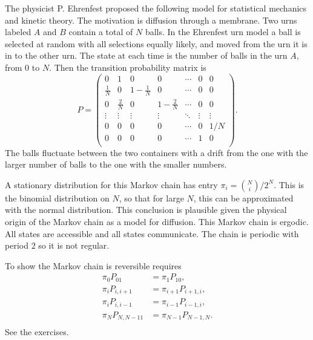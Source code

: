 \documentclass[12pt]{article}
\begin{document}
The physicist P. Ehrenfest proposed the following model for statistical
mechanics and kinetic theory.  The motivation is diffusion through a
membrane.  Two urns labeled \( A \) and \( B \) contain a total of \( N \)
balls.  In the Ehrenfest urn model a%
%
%
ball is selected at random with all selections equally likely, and moved
from the urn it is in to the other urn.  The state at each time is the
number of balls in the urn \( A \), from \( 0 \) to \( N \).  Then the
transition probability matrix is
\[
    P =
    \begin{pmatrix}
        0       & 1     & 0     & 0     & \cdots        & 0     & 0 \\
        \frac{1}{N}     & 0     & 1-\frac{1}{N} & 0     & \cdots
        & 0     & 0 \\
        0       & \frac{2}{N}   & 0     & 1-\frac{2}{N} & \cdots
        & 0     & 0 \\
        \vdots  & \vdots        & \vdots        & \vdots        & \ddots&
        \vdots  & \vdots \\
        0       & 0     & 0     & 0     & \cdots        & 0     & 1/N \\
        0       & 0     & 0     & 0     & \cdots        & 1     & 0 \\
    \end{pmatrix}
    .
\] The balls fluctuate between the two containers with a drift from the
one with the larger number of balls to the one with the smaller numbers.

A stationary distribution for this Markov chain has entry \( \pi_i =
\binom{N}{i}/2^N \).  This is the binomial distribution on \( N \), so
that for large \( N \), this can be approximated with the normal
distribution.  This conclusion is plausible given the physical origin of
the Markov chain as a model for diffusion.  This Markov chain is
ergodic.  All states are accessible and all states communicate.  The
chain is periodic with period \( 2 \) so it is not regular.

To show the Markov chain is reversible requires
\begin{align*}
    \pi_0 P_{01} &= \pi_1 P_{10}, \\
    \pi_i P_{i,i+1} &= \pi_{i+1} P_{i+1,i}, \\
    \pi_i P_{i,i-1} &= \pi_{i-1} P_{i-1,i}, \\
    \pi_N P_{N,N-11} &= \pi_{N-1} P_{N-1,N}.  \\
\end{align*}
See the exercises.
\end{document}
